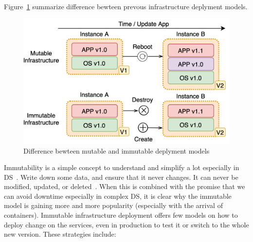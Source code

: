 \noindent
Figure~\ref{fig:fig12} summarize difference bewteen prevous infrastructure deplyment models.

\begin{figure}[H]
	\begin{center}
		\includegraphics[scale=0.9]{images/Figure12.png}
	\end{center}
	\vspace{-0.6cm}
	\caption{Difference bewteen mutable and immutable deplyment models}
	\label{fig:fig12}
\end{figure}

Immutability is a simple concept to understand and simplify a lot especially in DS~\cite{Helland16}. Write down some data, and ensure that it never changes. It can never be modified, updated, or deleted~\cite{perry2020art}. When this is combined with the promise that we can avoid downtime especially in complex DS, it is clear why the immutable model is gaining more and more popularity (especially with the arrival of containers). Immutable infrastructure deployment offers few models on how to deploy change on the services, even in production to test it or switch to the whole new version. These strategies include:

